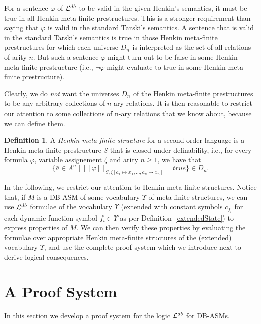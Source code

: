 \documentclass[preprint,11pt]{elsarticle}
\theoremstyle{definition}
\newtheorem{definition}{Definition}[section]
\theoremstyle{remark}
\begin{document}
For a sentence $\varphi$ of ${\cal L}^{db}$ to be valid in the given Henkin's semantics, it must be true in all Henkin meta-finite prestructures. This is a stronger requirement than saying that $\varphi$ is valid in the standard Tarski's semantics. A sentence that is valid in the standard Tarski's semantics is true in those Henkin meta-finite prestructures for which each universe $D_n$ is interpreted as the set of all relations of arity $n$. But such a sentence $\varphi$ might turn out to be false in some Henkin meta-finite prestructure (i.e., $\neg \varphi$ might evaluate to true in some Henkin meta-finite prestructure).

Clearly, we do \emph{not} want the universes $D_n$ of the Henkin meta-finite prestructures to be any arbitrary collections of $n$-ary relations. It is then reasonable to restrict our attention to some collections of n-ary relations that we know about, because we can define them.  

\begin{definition}\label{HenkinStructure}
A \emph{Henkin meta-finite structure} for a second-order language is a Henkin meta-finite prestructure $S$ that is closed under definability, i.e., for every formula $\varphi$, variable assignement $\zeta$ and arity $n \geq 1$, we have that \[\{\bar{a} \in A^n \mid [\![\varphi]\!]_{S,\zeta[a_1 \mapsto x_1, \ldots, a_n \mapsto x_n]} = \textit{true}\} \in D_n.\]  
\end{definition}

In the following, we restrict our attention to Henkin meta-finite structures. Notice that, if $M$ is a DB-ASM of some vocabulary $\Upsilon$ of meta-finite structures, we can use ${\cal L}^{db}$ formulae of the vocabulary $\Upsilon$ (extended with constant symbols $c_{f_i}$ for each dynamic function symbol $f_i \in \Upsilon$ as per Definition~\ref{extendedState}) to express properties of $M$. We can then verify these properties by evaluating the formulae over appropriate Henkin meta-finite structures of the (extended) vocabulary $\Upsilon$, and use the complete proof system which we introduce next to derive logical consequences. 

\section{A Proof System} \label{sec:proof_system}

In this section we develop a proof system for the logic ${\cal L}^{db}$ for DB-ASMs.
\end{document}
